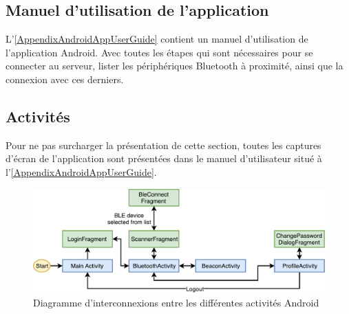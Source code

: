\subsection{Manuel d'utilisation de l'application}

L'\cref{AppendixAndroidAppUserGuide} contient un manuel d'utilisation de l'application Android. Avec toutes les étapes qui sont nécessaires pour se connecter au serveur, lister les périphériques Bluetooth à proximité, ainsi que la connexion avec ces derniers.


\subsection{Activités}

 Pour ne pas surcharger la présentation de cette section, toutes les captures d'écran de l'application sont présentées dans le manuel d'utilisateur situé à l'\cref{AppendixAndroidAppUserGuide}.
 
 
\begin{figure}[ht!]
    \centering
    \includegraphics[width=1.0\textwidth]{Figures/Software/diagram_android_activites.pdf}
    \caption{Diagramme d'interconnexions entre les différentes activités Android}
    \label{fig-diagram_android_activites}
\end{figure}


